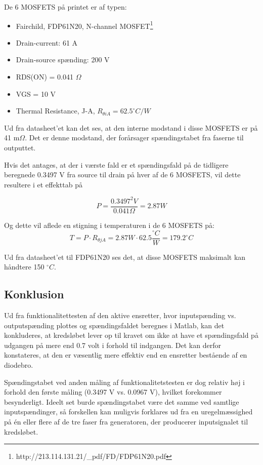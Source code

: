 De 6 MOSFETS på printet er af typen:
\begin{itemize}
\item Fairchild, FDP61N20, N-channel MOSFET\footnote{http://213.114.131.21/_pdf/FD/FDP61N20.pdf}
\item Drain-current: 61 A
\item Drain-source spænding: 200 V
\item RDS(ON) = 0.041 $\Omega$
\item VGS = 10 V
\item Thermal Resistance, J-A, $R_{\theta iA} = 62.5^\circ C/W$
\end{itemize}

Ud fra datasheet’et kan det ses, at den interne modstand i disse MOSFETS er på 41 m$\Omega$. Det er denne modstand, der forårsager spændingstabet fra faserne til outputtet. 

Hvis det antages, at der i værste fald er et spændingsfald på de tidligere beregnede 0.3497 V fra source til drain på hver af de 6 MOSFETS, vil dette resultere i et effekttab på 

\begin{equation}
  \label{eq:1}
  P = \frac{0.3497^2V}{0.041 \Omega}=2.87W
\end{equation}

Og dette vil aflede en stigning i temperaturen i de 6 MOSFETS på:
\begin{equation}
  \label{eq:2}
  T = P \cdot R_{\theta jA}=2.87 W\cdot 62.5 \frac{^\circ C}{W} = 179.2 ^\circ C
\end{equation}

Ud fra datasheet’et til FDP61N20 ses det, at disse MOSFETS maksimalt kan håndtere 150 $^\circ C$.

\subsection{Konklusion}
\label{sec:konklusion}

Ud fra funktionalitettesten af den aktive ensretter, hvor inputspænding vs. outputspænding plottes og spændingsfaldet beregnes i Matlab, kan det konkluderes, at kredsløbet lever op til kravet om ikke at have et spændingsfald på udgangen på mere end 0.7 volt i forhold til indgangen.  Det kan derfor konstateres, at den er væsentlig mere effektiv end en ensretter bestående af en diodebro.   

Spændingstabet ved anden måling af funktionalitetstesten er dog relativ høj i forhold den første måling (0.3497 V vs. 0.0967 V), hvilket forekommer besynderligt. Ideelt set burde spændingstabet være det samme ved samtlige inputspændinger, så forskellen kan muligvis forklares ud fra en uregelmæssighed på én eller flere af de tre faser fra generatoren, der producerer inputsignalet til kredsløbet. 

